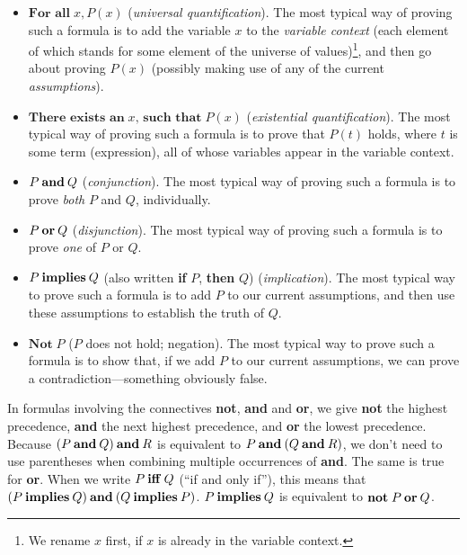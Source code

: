 \begin{itemize}
\item $\textbf{For all}\; x, P(x)$ (\emph{universal
%
%
    quantification}). The most typical way of proving such a formula
  is to add the variable $x$ to the \emph{variable context} (each
  element of which stands for some element of the universe of
  values)\footnote{We rename $x$ first, if $x$ is already in the
    variable context.}, and then go about proving $P(x)$ (possibly
  making use of any of the current \emph{assumptions}).
%
%

\item $\textbf{There exists an}\; x, \,\textbf{such that}\; P(x)$
  (\emph{existential quantification}).  The most typical way of
%
%
  proving such a formula is to prove that $P(t)$ holds, where $t$ is
  some term (expression), all of whose variables appear in the
  variable context.

\item $P \mathbin{\mathbf{and}} Q$ (\emph{conjunction}). The most typical way of
%
%
  proving such a formula is to prove \emph{both} $P$ and $Q$, individually.

\item $P \mathbin{\mathbf{or}} Q$ (\emph{disjunction}). The most typical way
%
%
  of proving such a formula is to prove \emph{one} of $P$ or $Q$.

\item $P \mathbin{\mathbf{implies}} Q$ (also written \textbf{if} $P$,
  \textbf{then} $Q$) (\emph{implication}).  The most typical way to
%
%
  prove such a formula is to add $P$ to our current assumptions, and
  then use these assumptions to establish the truth of $Q$.

\item $\textbf{Not}\; P$ ($P$ does not hold; negation). The most typical
%
%
  way to prove such a formula is to show that, if we add $P$ to our
  current assumptions, we can prove a contradiction---something obviously
  false.
\end{itemize}

In formulas involving the connectives \textbf{not}, \textbf{and} and
\textbf{or}, we give \textbf{not} the highest precedence, \textbf{and}
the next highest precedence, and \textbf{or} the lowest
precedence. Because $(P \mathbin{\mathbf{and}} Q) \mathbin{\mathbf{and}} R$ is
equivalent to $P \mathbin{\mathbf{and}} (Q \mathbin{\mathbf{and}} R)$, we don't need
to use parentheses when combining multiple occurrences of
\textbf{and}.  The same is true for \textbf{or}.
When we write $P \mathbin{\mathbf{iff}} Q$ (``if and only if''), this means that
$(P \mathbin{\mathbf{implies}} Q) \mathbin{\mathbf{and}} (Q \mathbin{\mathbf{implies}} P)$.  $P \mathbin{\mathbf{implies}} Q$
is equivalent to $\textbf{not}\;P \mathbin{\mathbf{or}} Q$.

